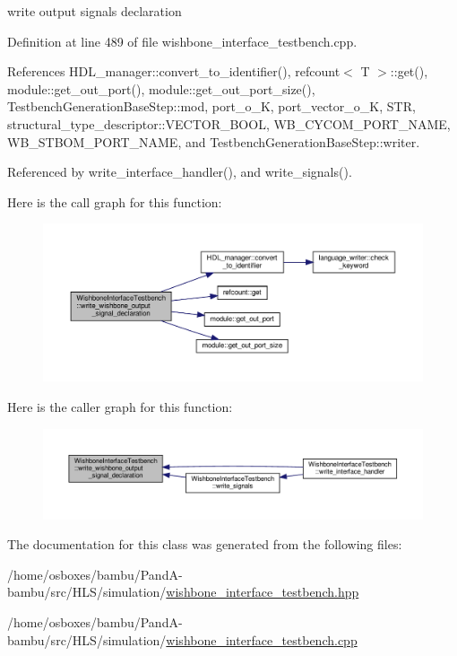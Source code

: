 write output signals declaration 

Definition at line 489 of file wishbone\+\_\+interface\+\_\+testbench.\+cpp.



References H\+D\+L\+\_\+manager\+::convert\+\_\+to\+\_\+identifier(), refcount$<$ T $>$\+::get(), module\+::get\+\_\+out\+\_\+port(), module\+::get\+\_\+out\+\_\+port\+\_\+size(), Testbench\+Generation\+Base\+Step\+::mod, port\+\_\+o\+\_\+K, port\+\_\+vector\+\_\+o\+\_\+K, S\+TR, structural\+\_\+type\+\_\+descriptor\+::\+V\+E\+C\+T\+O\+R\+\_\+\+B\+O\+OL, W\+B\+\_\+\+C\+Y\+C\+O\+M\+\_\+\+P\+O\+R\+T\+\_\+\+N\+A\+ME, W\+B\+\_\+\+S\+T\+B\+O\+M\+\_\+\+P\+O\+R\+T\+\_\+\+N\+A\+ME, and Testbench\+Generation\+Base\+Step\+::writer.



Referenced by write\+\_\+interface\+\_\+handler(), and write\+\_\+signals().

Here is the call graph for this function\+:
\nopagebreak
\begin{figure}[H]
\begin{center}
\leavevmode
\includegraphics[width=350pt]{de/ded/classWishboneInterfaceTestbench_ab0f2a4e30aad0f4854e902054d1a6114_cgraph}
\end{center}
\end{figure}
Here is the caller graph for this function\+:
\nopagebreak
\begin{figure}[H]
\begin{center}
\leavevmode
\includegraphics[width=350pt]{de/ded/classWishboneInterfaceTestbench_ab0f2a4e30aad0f4854e902054d1a6114_icgraph}
\end{center}
\end{figure}


The documentation for this class was generated from the following files\+:\begin{DoxyCompactItemize}
\item 
/home/osboxes/bambu/\+Pand\+A-\/bambu/src/\+H\+L\+S/simulation/\hyperlink{wishbone__interface__testbench_8hpp}{wishbone\+\_\+interface\+\_\+testbench.\+hpp}\item 
/home/osboxes/bambu/\+Pand\+A-\/bambu/src/\+H\+L\+S/simulation/\hyperlink{wishbone__interface__testbench_8cpp}{wishbone\+\_\+interface\+\_\+testbench.\+cpp}\end{DoxyCompactItemize}
